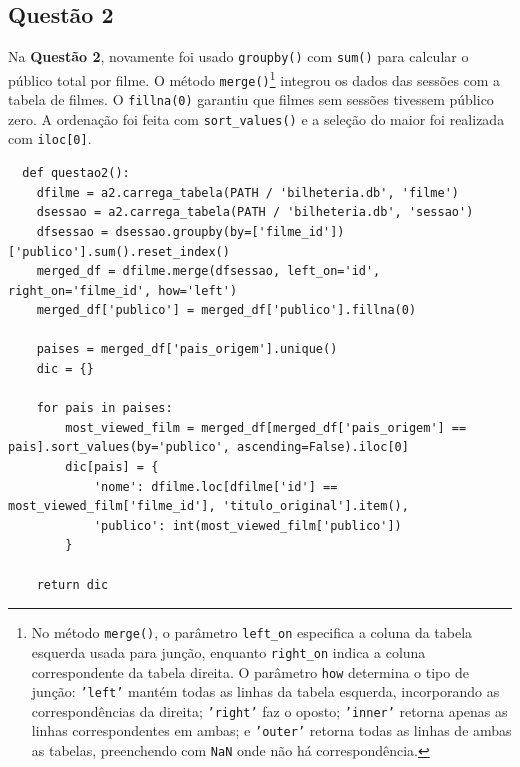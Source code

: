 \documentclass{article}
\begin{document}
\subsection*{Questão 2}
Na \textbf{Questão 2}, novamente foi usado \texttt{groupby()} com \texttt{sum()} para calcular o público total por filme. O método \texttt{merge()}\footnote{No método \texttt{merge()}, o parâmetro \texttt{left\_on} especifica a coluna da tabela esquerda usada para junção, enquanto \texttt{right\_on} indica a coluna correspondente da tabela direita. O parâmetro \texttt{how} determina o tipo de junção: \texttt{'left'} mantém todas as linhas da tabela esquerda, incorporando as correspondências da direita; \texttt{'right'} faz o oposto; \texttt{'inner'} retorna apenas as linhas correspondentes em ambas; e \texttt{'outer'} retorna todas as linhas de ambas as tabelas, preenchendo com \texttt{NaN} onde não há correspondência.} integrou os dados das sessões com a tabela de filmes. O \texttt{fillna(0)} garantiu que filmes sem sessões tivessem público zero. A ordenação foi feita com \texttt{sort\_values()} e a seleção do maior foi realizada com \texttt{iloc[0]}.
\linespread{1}
\begin{lstlisting}
  def questao2():
    dfilme = a2.carrega_tabela(PATH / 'bilheteria.db', 'filme')
    dsessao = a2.carrega_tabela(PATH / 'bilheteria.db', 'sessao')
    dfsessao = dsessao.groupby(by=['filme_id'])['publico'].sum().reset_index()
    merged_df = dfilme.merge(dfsessao, left_on='id', right_on='filme_id', how='left')
    merged_df['publico'] = merged_df['publico'].fillna(0)
    
    paises = merged_df['pais_origem'].unique()
    dic = {}
    
    for pais in paises:
        most_viewed_film = merged_df[merged_df['pais_origem'] == pais].sort_values(by='publico', ascending=False).iloc[0]
        dic[pais] = {
            'nome': dfilme.loc[dfilme['id'] == most_viewed_film['filme_id'], 'titulo_original'].item(),
            'publico': int(most_viewed_film['publico'])
        }
    
    return dic
\end{lstlisting}

\linespread{1.5}
\pagebreak
\end{document}
